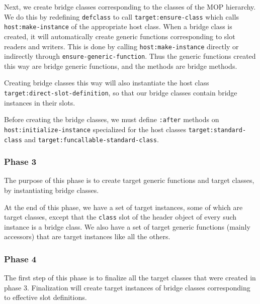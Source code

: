 Next, we create bridge classes corresponding to the classes of the MOP
hierarchy.  We do this by redefining \texttt{defclass} to call
\texttt{target:ensure-class} which calls \texttt{host:make-instance}
of the appropriate host class.  When a bridge class is created, it
will automatically create generic functions corresponding to slot
readers and writers.  This is done by calling
\texttt{host:make-instance} directly or indirectly through
\texttt{ensure-generic-function}.  Thus the generic functions created
this way are bridge generic functions, and the methods are bridge
methods.

Creating bridge classes this way will also instantiate the host class
\texttt{target:direct-slot-definition}, so that our bridge classes
contain bridge instances in their slots. 

Before creating the bridge classes, we must define \texttt{:after}
methods on \texttt{host:initialize-instance} specialized for the host
classes \texttt{target:standard-class} and
\texttt{target:funcallable-standard-class}.  

\subsubsection{Phase 3}

The purpose of this phase is to create target generic functions and
target classes, by instantiating bridge classes.  

At the end of this phase, we have a set of target instances, some of
which are target classes, except that the \texttt{class} slot of the
header object of every such instance is a bridge class.  We also have
a set of target generic functions (mainly accessors) that are target
instances like all the others. 

\subsubsection{Phase 4}

The first step of this phase is to finalize all the target classes
that were created in phase 3.  Finalization will create target
instances of bridge classes corresponding to effective slot
definitions. 

